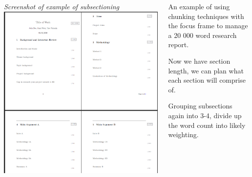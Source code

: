 \documentclass[unknownkeysallowed,usepdftitle=false, parskip=full]{beamer}
\newcommand{\secvariable}{nothing}
\newcommand{\mysection}[1]{\renewcommand{\secvariable}{#1}
}
\begin{document}
\mysection{minor}
\begin{frame}\label{\secvariable} %
    \begin{columns}[t]
    \begin{column}[c]{0.6\textwidth}
       \tiny{\textit{Screenshot of example of subsectioning}} \includegraphics[scale=0.4]{figure/subsectioning}
    \end{column}
    \begin{column}[c]{0.45\textwidth}
    \parbox{\linewidth}{

    \small An example of using chunking techniques with the focus frame to manage a 20 000 word research report.
    
    \vspace{12pt}
    
    Now we have section length, we can plan what each section will comprise of.
    
    \vspace{12pt}
    
    Grouping subsections again into 3-4, divide up the word count into likely weighting.
    }
    \end{column}
    
  \end{columns}

\end{frame}
\end{document}
